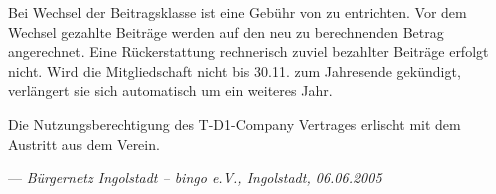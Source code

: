 Bei Wechsel der Beitragsklasse ist eine Gebühr von   zu entrichten.
Vor dem Wechsel gezahlte Beiträge werden auf den neu zu berechnenden Betrag angerechnet.
Eine Rückerstattung rechnerisch zuviel bezahlter Beiträge erfolgt nicht.
Wird die Mitgliedschaft nicht bis 30.11. zum Jahresende gekündigt,
verlängert sie sich automatisch um ein weiteres Jahr.

Die Nutzungsberechtigung des T-D1-Company Vertrages erlischt mit dem Austritt aus dem Verein.

\hfill --- \textit{Bürgernetz Ingolstadt -- bingo e.V., Ingolstadt, 06.06.2005}
\newpage
